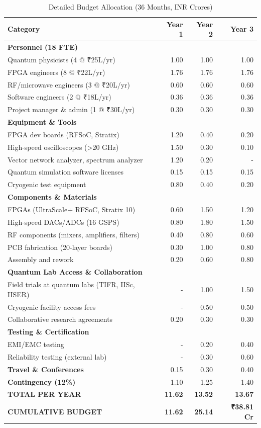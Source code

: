 \documentclass[12pt,a4paper]{article}
\begin{document}
\begin{enumerate}[leftmargin=*]
\begin{table}[H]
\centering
\caption{Detailed Budget Allocation (36 Months, INR Crores)}
\small
\begin{tabular}{@{}lrrr@{}}
\toprule
\textbf{Category} & \textbf{Year 1} & \textbf{Year 2} & \textbf{Year 3} \\
\midrule
\textbf{Personnel (18 FTE)} & & & \\
Quantum physicists (4 @ ₹25L/yr) & 1.00 & 1.00 & 1.00 \\
FPGA engineers (8 @ ₹22L/yr) & 1.76 & 1.76 & 1.76 \\
RF/microwave engineers (3 @ ₹20L/yr) & 0.60 & 0.60 & 0.60 \\
Software engineers (2 @ ₹18L/yr) & 0.36 & 0.36 & 0.36 \\
Project manager \& admin (1 @ ₹30L/yr) & 0.30 & 0.30 & 0.30 \\
\midrule
\textbf{Equipment \& Tools} & & & \\
FPGA dev boards (RFSoC, Stratix) & 1.20 & 0.40 & 0.20 \\
High-speed oscilloscopes (>20 GHz) & 1.50 & 0.30 & 0.10 \\
Vector network analyzer, spectrum analyzer & 1.20 & 0.20 & - \\
Quantum simulation software licenses & 0.15 & 0.15 & 0.15 \\
Cryogenic test equipment & 0.80 & 0.40 & 0.20 \\
\midrule
\textbf{Components \& Materials} & & & \\
FPGAs (UltraScale+ RFSoC, Stratix 10) & 0.60 & 1.50 & 1.20 \\
High-speed DACs/ADCs (16 GSPS) & 0.80 & 1.80 & 1.50 \\
RF components (mixers, amplifiers, filters) & 0.40 & 0.80 & 0.60 \\
PCB fabrication (20-layer boards) & 0.30 & 1.00 & 0.80 \\
Assembly and rework & 0.20 & 0.60 & 0.80 \\
\midrule
\textbf{Quantum Lab Access \& Collaboration} & & & \\
Field trials at quantum labs (TIFR, IISc, IISER) & - & 1.00 & 1.50 \\
Cryogenic facility access fees & - & 0.50 & 0.50 \\
Collaborative research agreements & 0.20 & 0.30 & 0.30 \\
\midrule
\textbf{Testing \& Certification} & & & \\
EMI/EMC testing & - & 0.20 & 0.40 \\
Reliability testing (external lab) & - & 0.30 & 0.60 \\
\midrule
\textbf{Travel \& Conferences} & 0.15 & 0.30 & 0.40 \\
\textbf{Contingency (12\%)} & 1.10 & 1.25 & 1.40 \\
\midrule
\textbf{TOTAL PER YEAR} & \textbf{11.62} & \textbf{13.52} & \textbf{13.67} \\
\midrule
\textbf{CUMULATIVE BUDGET} & \textbf{11.62} & \textbf{25.14} & \textbf{₹38.81 Cr} \\
\bottomrule
\end{tabular}
\end{table}


\end{enumerate}
\end{document}
